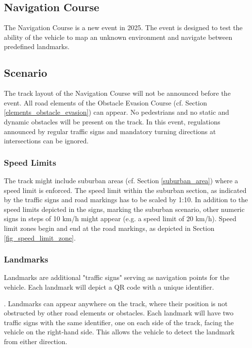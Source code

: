 
\begin{highlight}[yellow]

    \section{Navigation Course}
    \label{navigation_course}

    The Navigation Course is a new event in 2025. The event is designed to test the
    ability of the vehicle to map an unknown environment and navigate between
    predefined landmarks.

    \subsection{Scenario}

    The track layout of the Navigation Course will not be announced before the
    event. All road elements of the Obstacle Evasion Course (cf. Section
    \ref{elements_obstacle_evasion}) can appear. No pedestrians and no static and
    dynamic obstacles will be present on the track. In this event, regulations
    announced by regular traffic signs and mandatory turning directions at
    intersections can be ignored.

    \subsubsection{Speed Limits}

    The track might include suburban areas (cf. Section \ref{suburban_area}) where
    a speed limit is enforced. The speed limit within the suburban section, as
    indicated by the traffic signs and road markings has to be scaled by 1:10. In
    addition to the speed limits depicted in the signs, marking the suburban
    scenario, other numeric signs in steps of 10 km/h might appear (e.g. a speed
    limit of 20 km/h). Speed limit zones begin and end at the road markings, as
    depicted in Section \ref{fig_speed_limit_zone}.

    \subsubsection{Landmarks}
    \label{landmarks}

    Landmarks are additional "traffic signs" serving as navigation points for the
    vehicle. Each landmark will depict a QR code with a unique identifier.

    .
    Landmarks can appear anywhere on the track, where their position is not 
    obstructed by other road elements or obstacles. Each landmark will have two 
    traffic signs with the same identifier, one on each side of the track, facing 
    the vehicle on the right-hand side. This allows the vehicle to detect the 
    landmark from either direction.


\end{highlight}
